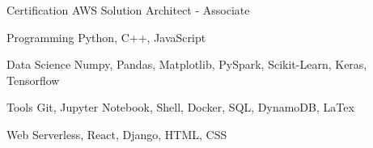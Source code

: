 


\begin{cvskills}


\cvskill
{Certification}
{AWS Solution Architect - Associate}


\cvskill
{Programming}
{Python, C++, JavaScript}


\cvskill
{Data Science}
{Numpy, Pandas, Matplotlib, PySpark, Scikit-Learn, Keras, Tensorflow}


\cvskill
{Tools}
{Git, Jupyter Notebook, Shell, Docker, SQL, DynamoDB, LaTex}


\cvskill
{Web}
{Serverless, React, Django, HTML, CSS}


\end{cvskills}